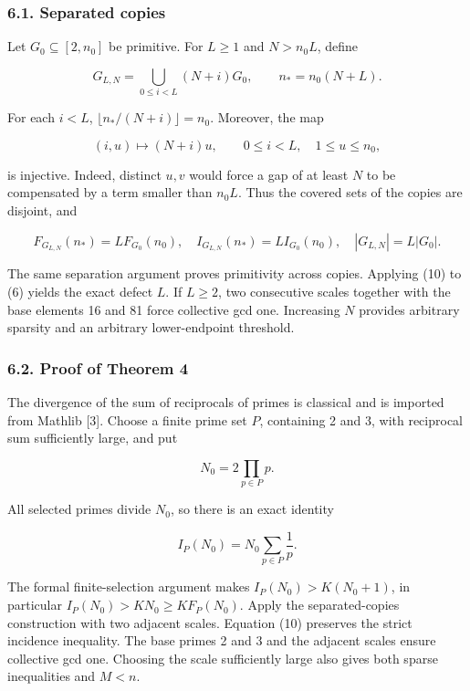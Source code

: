 \documentclass[
  11pt,
]{article}
\begin{document}
\hypertarget{separated-copies}{%
\subsubsection{6.1. Separated copies}\label{separated-copies}}

Let \(G_0\subseteq[2,n_0]\) be primitive. For \(L\ge1\) and \(N>n_0L\),
define

\[
G_{L,N}=\bigcup_{0\le i<L}(N+i)G_0,
\qquad n_*=n_0(N+L).
\]

For each \(i<L\), \(\lfloor n_* /(N+i)\rfloor=n_0\). Moreover, the map

\[
(i,u)\longmapsto(N+i)u,\qquad 0\le i<L,\quad1\le u\le n_0,
\]

is injective. Indeed, distinct \(u,v\) would force a gap of at least
\(N\) to be compensated by a term smaller than \(n_0L\). Thus the
covered sets of the copies are disjoint, and

\[
F_{G_{L,N}}(n_*)=LF_{G_0}(n_0),\quad
I_{G_{L,N}}(n_*)=LI_{G_0}(n_0),\quad |G_{L,N}|=L|G_0|. \tag{10}
\]

The same separation argument proves primitivity across copies. Applying
(10) to (6) yields the exact defect \(L\). If \(L\ge2\), two consecutive
scales together with the base elements 16 and 81 force collective gcd
one. Increasing \(N\) provides arbitrary sparsity and an arbitrary
lower-endpoint threshold.

\hypertarget{proof-of-theorem-4}{%
\subsubsection{6.2. Proof of Theorem 4}\label{proof-of-theorem-4}}

The divergence of the sum of reciprocals of primes is classical and is
imported from Mathlib {[}3{]}. Choose a finite prime set \(P\),
containing 2 and 3, with reciprocal sum sufficiently large, and put

\[
N_0=2\prod_{p\in P}p.
\]

All selected primes divide \(N_0\), so there is an exact identity

\[
I_P(N_0)=N_0\sum_{p\in P}\frac1p.
\]

The formal finite-selection argument makes \(I_P(N_0)>K(N_0+1)\), in
particular \(I_P(N_0)>KN_0\ge KF_P(N_0)\). Apply the separated-copies
construction with two adjacent scales. Equation (10) preserves the
strict incidence inequality. The base primes 2 and 3 and the adjacent
scales ensure collective gcd one. Choosing the scale sufficiently large
also gives both sparse inequalities and \(M<n\).
\end{document}
